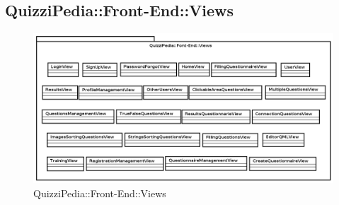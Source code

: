 \newpage
\subsection{QuizziPedia::Front-End::Views}

\label{QuizziPedia::Front-End::Views}
\begin{figure}[ht]
	\centering
	\includegraphics[scale=0.55]{UML/Package/QuizziPedia_Front-End_Views.png}
	\caption{QuizziPedia::Front-End::Views}
\end{figure}\FloatBarrier
